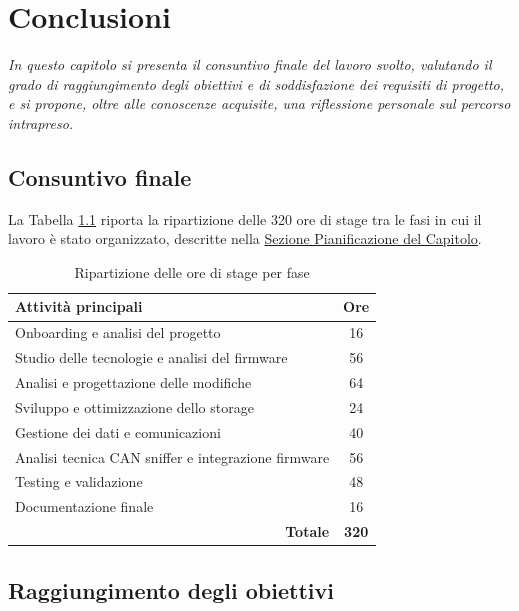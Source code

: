 \chapter{Conclusioni} \label{chap:conclusioni}

\textit{In questo capitolo si presenta il consuntivo finale del lavoro svolto,
valutando il grado di raggiungimento degli obiettivi e di soddisfazione dei
requisiti di progetto, e si propone, oltre alle conoscenze acquisite, una 
riflessione personale sul percorso intrapreso.}

\section{Consuntivo finale}
\label{sec:consuntivo-finale}

La Tabella \ref{tab:consuntivo-ore} riporta la ripartizione delle 320 ore di stage tra le fasi in cui il
lavoro è stato organizzato, descritte nella \hyperref[sec:pianificazione]{Sezione Pianificazione del Capitolo}.

\begin{table}[H]
    \centering
    \begin{tabular}{p{9cm} c}
        \hline
        \textbf{Attività principali} & \textbf{Ore} \\
        \hline
        Onboarding e analisi del progetto & 16 \\
        \hline
        Studio delle tecnologie e analisi del firmware & 56\\
        \hline
        Analisi e progettazione delle modifiche & 64\\
        \hline
        Sviluppo e ottimizzazione dello storage & 24\\
        \hline
        Gestione dei dati e comunicazioni & 40\\
        \hline
        Analisi tecnica CAN sniffer e integrazione firmware & 56\\
        \hline
        Testing e validazione & 48\\
        \hline
        Documentazione finale & 16\\
        \hline
        \multicolumn{1}{r}{\textbf{Totale}} & \textbf{320} \\
        \hline
    \end{tabular}
    \caption{Ripartizione delle ore di stage per fase}
    \label{tab:consuntivo-ore}
\end{table}

\section{Raggiungimento degli obiettivi}
\label{sec:raggiungimento-obiettivi}

